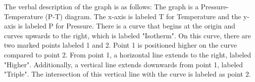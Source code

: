The verbal description of the graph is as follows: The graph is a Pressure-Temperature (P-T) diagram. The x-axis is labeled T for Temperature and the y-axis is labeled P for Pressure. There is a curve that begins at the origin and curves upwards to the right, which is labeled "Isotherm". On this curve, there are two marked points labeled 1 and 2. Point 1 is positioned higher on the curve compared to point 2. From point 1, a horizontal line extends to the right, labeled "Higher". Additionally, a vertical line extends downwards from point 1, labeled "Triple". The intersection of this vertical line with the curve is labeled as point 2.